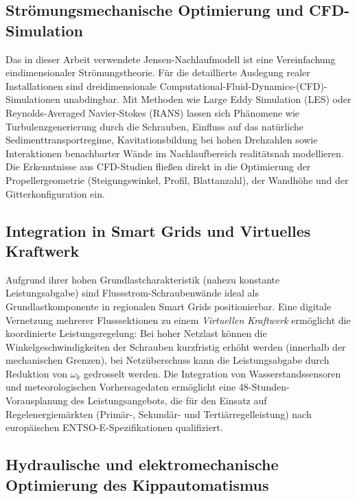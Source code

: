 ﻿\documentclass[a4paper,12pt]{article}
\theoremstyle{definition}
\begin{document}
\subsection{Strömungsmechanische Optimierung und CFD-Simulation}

Das in dieser Arbeit verwendete Jensen-Nachlaufmodell ist eine Vereinfachung
eindimensionaler Strömungstheorie. Für die detaillierte Auslegung realer Installationen
sind dreidimensionale Computational-Fluid-Dynamics-(CFD)-Simulationen unabdingbar.
Mit Methoden wie Large Eddy Simulation (LES) oder Reynolds-Averaged Navier-Stokes
(RANS) lassen sich Phänomene wie Turbulenzgenerierung durch die Schrauben, Einfluss
auf das natürliche Sedimenttransportregime, Kavitationsbildung bei hohen
Drehzahlen sowie Interaktionen benachbarter Wände im Nachlaufbereich realitätsnah
modellieren. Die Erkenntnisse aus CFD-Studien fließen direkt in die Optimierung der
Propellergeometrie (Steigungswinkel, Profil, Blattanzahl), der Wandhöhe und der
Gitterkonfiguration ein.

\subsection{Integration in Smart Grids und Virtuelles Kraftwerk}

Aufgrund ihrer hohen Grundlastcharakteristik (nahezu konstante Leistungsabgabe)
sind Flussstrom-Schraubenwände ideal als Grundlastkomponente in regionalen
Smart Grids positionierbar. Eine digitale Vernetzung mehrerer Flusssektionen zu
einem \emph{Virtuellen Kraftwerk} ermöglicht die koordinierte Leistungsregelung:
Bei hoher Netzlast können die Winkelgeschwindigkeiten der Schrauben kurzfristig
erhöht werden (innerhalb der mechanischen Grenzen), bei Netzüberschuss kann die
Leistungsabgabe durch Reduktion von $\omega_k$ gedrosselt werden. Die Integration
von Wasserstandssensoren und meteorologischen Vorhersagedaten ermöglicht eine
$48$-Stunden-Vorausplanung des Leistungsangebots, die für den Einsatz auf
Regelenergiemärkten (Primär-, Sekundär- und Tertiärregelleistung) nach europäischen
ENTSO-E-Spezifikationen qualifiziert.

\subsection{Hydraulische und elektromechanische Optimierung des Kippautomatismus}
\end{document}
